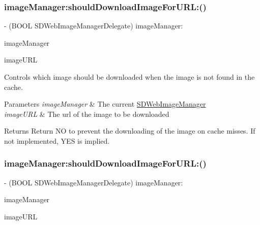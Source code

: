 \subsubsection{\texorpdfstring{image\+Manager\+:should\+Download\+Image\+For\+U\+R\+L\+:()}{imageManager:shouldDownloadImageForURL:()}\hspace{0.1cm}{\footnotesize\ttfamily [1/3]}}
{\footnotesize\ttfamily -\/ (B\+O\+OL S\+D\+Web\+Image\+Manager\+Delegate) image\+Manager\+: \begin{DoxyParamCaption}\item[{(\mbox{\hyperlink{interface_s_d_web_image_manager}{S\+D\+Web\+Image\+Manager}} $\ast$)}]{image\+Manager }\item[{shouldDownloadImageForURL:(N\+S\+U\+RL $\ast$)}]{image\+U\+RL }\end{DoxyParamCaption}\hspace{0.3cm}{\ttfamily [optional]}}

Controls which image should be downloaded when the image is not found in the cache.


\begin{DoxyParams}{Parameters}
{\em image\+Manager} & The current {\ttfamily \mbox{\hyperlink{interface_s_d_web_image_manager}{S\+D\+Web\+Image\+Manager}}} \\
\hline
{\em image\+U\+RL} & The url of the image to be downloaded\\
\hline
\end{DoxyParams}
\begin{DoxyReturn}{Returns}
Return NO to prevent the downloading of the image on cache misses. If not implemented, Y\+ES is implied. 
\end{DoxyReturn}
\mbox{\label{protocol_s_d_web_image_manager_delegate_01-p_abb8b74284f0c06034a5a3b4f5da4f45e}} 
\subsubsection{\texorpdfstring{image\+Manager\+:should\+Download\+Image\+For\+U\+R\+L\+:()}{imageManager:shouldDownloadImageForURL:()}\hspace{0.1cm}{\footnotesize\ttfamily [2/3]}}
{\footnotesize\ttfamily -\/ (B\+O\+OL S\+D\+Web\+Image\+Manager\+Delegate) image\+Manager\+: \begin{DoxyParamCaption}\item[{(\mbox{\hyperlink{interface_s_d_web_image_manager}{S\+D\+Web\+Image\+Manager}} $\ast$)}]{image\+Manager }\item[{shouldDownloadImageForURL:(N\+S\+U\+RL $\ast$)}]{image\+U\+RL }\end{DoxyParamCaption}\hspace{0.3cm}{\ttfamily [optional]}}

